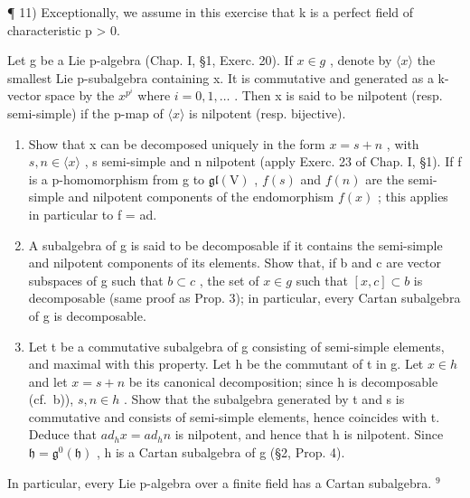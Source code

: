 ¶ 11) Exceptionally, we assume in this exercise that k is a perfect field of characteristic p \textgreater{} 0.

Let g be a Lie p-algebra (Chap. I, §1, Exerc. 20). If \(x \in g\) , denote by \(\langle x \rangle\) the smallest Lie p-subalgebra containing x. It is commutative and generated as a k-vector space by the \(x^{p^{i}}\) where \(i = 0, 1, \ldots\) . Then x is said to be nilpotent (resp. semi-simple) if the p-map of \(\langle x \rangle\) is nilpotent (resp. bijective).

\begin{enumerate}
\def\labelenumi{\alph{enumi})}
\item
  Show that x can be decomposed uniquely in the form \(x = s + n\) , with \(s, n \in \langle x \rangle\) , s semi-simple and n nilpotent (apply Exerc. 23 of Chap. I, §1). If f is a p-homomorphism from g to \(\mathfrak{gl}(\mathrm{V})\) , \(f(s)\) and \(f(n)\) are the semi-simple and nilpotent components of the endomorphism \(f(x)\) ; this applies in particular to f = ad.
\item
  A subalgebra of g is said to be decomposable if it contains the semi-simple and nilpotent components of its elements. Show that, if b and c are vector subspaces of g such that \(b \subset c\) , the set of \(x \in g\) such that \([x, c] \subset b\) is decomposable (same proof as Prop. 3); in particular, every Cartan subalgebra of g is decomposable.
\item
  Let t be a commutative subalgebra of g consisting of semi-simple elements, and maximal with this property. Let h be the commutant of t in g. Let \(x \in h\) and let \(x = s + n\) be its canonical decomposition; since h is decomposable (cf.~b)), \(s, n \in h\) . Show that the subalgebra generated by t and s is commutative and consists of semi-simple elements, hence coincides with t. Deduce that \(ad_{h}x = ad_{h}n\) is nilpotent, and hence that h is nilpotent. Since \(\mathfrak{h} = \mathfrak{g}^{0}(\mathfrak{h})\) , h is a Cartan subalgebra of g (§2, Prop. 4).
\end{enumerate}

In particular, every Lie p-algebra over a finite field has a Cartan subalgebra. \(^{9}\)

